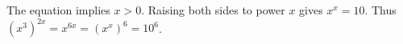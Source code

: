 The equation implies $x>0$. Raising both sides to power $x$ gives $x^x=10$. Thus $(x^3)^{2x}=x^{6x}=(x^x)^6=\boxed{10^6}$.
